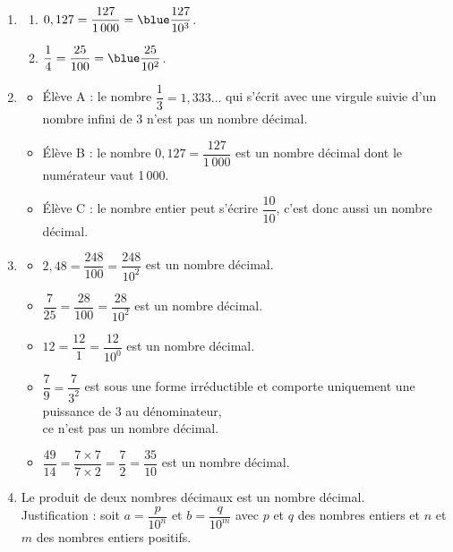 \begin{corrige}
\ \\ [-5mm]
   \begin{enumerate}
      \item
         \begin{enumerate}
            \item $0,127 =\dfrac{127}{1\,000} ={\blue \dfrac{127}{10^3}}$. \smallskip
            \item $\dfrac14 =\dfrac{25}{100} ={\blue \dfrac{25}{10^2}}$. \medskip
         \end{enumerate}
      \setcounter{enumi}{1}
      \item 
         \begin{itemize}
            \item Élève A : le nombre {\blue$\dfrac13 =1,333\dots$} qui s'écrit avec une virgule suivie d'un nombre infini de 3 n'est pas un nombre décimal.
            \item Élève B : le nombre {\blue$0,127 =\dfrac{127}{1\,000}$} est un nombre décimal dont le numérateur vaut 1\,000. 
            \item Élève C : le nombre entier {} peut s'écrire {\blue$\dfrac{10}{10}$}, c'est donc aussi un nombre décimal. \smallskip
         \end{itemize}
      \item 
         \begin{itemize}
            \item $2,48 =\dfrac{248}{100} =\dfrac{248}{10^2}$ {\blue est un nombre décimal}. \smallskip
            \item $\dfrac{7}{25} =\dfrac{28}{100} =\dfrac{28}{10^2}$ {\blue est un nombre décimal}. \smallskip
            \item $12 =\dfrac{12}{1} =\dfrac{12}{10^0}$ {\blue est un nombre décimal}. \smallskip
            \item $\dfrac{7}{9} =\dfrac{7}{3^2}$ est sous une forme irréductible et comporte uniquement une puissance de 3 au dénominateur, \\ [1mm]
               {\blue ce n'est pas un nombre décimal}. \smallskip
            \item $\dfrac{49}{14} =\dfrac{7\times7}{7\times2} =\dfrac72 =\dfrac{35}{10}$ {\blue est un nombre décimal}. \medskip
         \end{itemize}
      \item {\blue Le produit de deux nombres décimaux est un nombre décimal}. \\
        Justification : soit $a =\dfrac{p}{10^n}$ et $b =\dfrac{q}{10^m}$ avec $p$ et $q$ des nombres entiers et $n$ et $m$ des nombres entiers positifs. \\ [1mm]

\end{enumerate}
\end{corrige}
